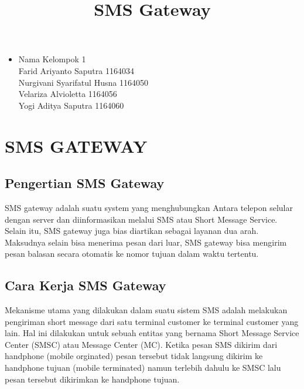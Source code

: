 \documentclass[12pt,a4paper]{article}
\begin{document}
\title{SMS Gateway}
\maketitle

\begin{itemize}
\item
Nama Kelompok 1\\
Farid Ariyanto Saputra 1164034\\
Nurgivani Syarifatul Husna 1164050\\
Velariza Alvioletta 1164056\\
Yogi Aditya Saputra 1164060 \\
\end{itemize}

\section{SMS GATEWAY}
\subsection{Pengertian SMS Gateway}
SMS gateway adalah suatu system yang menghubungkan Antara telepon selular dengan server dan diinformasikan melalui SMS atau Short Message Service. Selain itu, SMS gateway juga bias diartikan sebagai layanan dua arah. Maksudnya selain bisa menerima pesan dari luar,  SMS gateway bisa mengirim pesan balasan secara otomatis ke nomor tujuan dalam waktu tertentu.
\subsection{Cara Kerja SMS Gateway}
Mekanisme utama yang dilakukan dalam suatu sistem SMS adalah melakukan pengiriman short message dari satu terminal customer ke terminal customer yang lain. Hal ini dilakukan untuk sebuah entitas yang bernama  Short Message Service Center (SMSC) atau Message Center (MC). Ketika pesan SMS dikirim dari handphone (mobile orginated) pesan tersebut tidak langsung dikirim ke handphone tujuan (mobile terminated) namun terlebih dahulu ke SMSC lalu pesan tersebut dikirimkan ke handphone tujuan.
\end{document}

